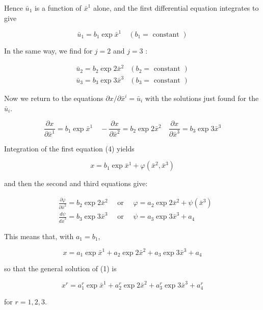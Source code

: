 \documentclass[10pt]{article}
\begin{document}
Hence $\bar{u}_{1}$ is a function of $\bar{x}^{1}$ alone, and the first differential equation integrates to give

$$
\bar{u}_{1}=b_{1} \exp \bar{x}^{1} \quad\left(b_{1}=\text { constant }\right)
$$

In the same way, we find for $j=2$ and $j=3$ :

$$
\begin{array}{ll}
\bar{u}_{2}=b_{2} \exp 2 \bar{x}^{2} & \left(b_{2}=\text { constant }\right) \\
\bar{u}_{3}=b_{3} \exp 3 \bar{x}^{3} & \left(b_{3}=\text { constant }\right)
\end{array}
$$

Now we return to the equations $\partial x / \partial \bar{x}^{i}=\bar{u}_{i}$ with the solutions just found for the $\bar{u}_{i}$.


\begin{equation*}
\frac{\partial x}{\partial \bar{x}^{1}}=b_{1} \exp \bar{x}^{1} \quad-\frac{\partial x}{\partial \bar{x}^{2}}=b_{2} \exp 2 \bar{x}^{2} \quad \frac{\partial x}{\partial \bar{x}^{3}}=b_{3} \exp 3 \bar{x}^{3} \tag{4}
\end{equation*}


Integration of the first equation (4) yields

$$
x=b_{1} \exp \bar{x}^{1}+\varphi\left(\bar{x}^{2}, \bar{x}^{3}\right)
$$

and then the second and third equations give:

$$
\begin{aligned}
& \frac{\partial \varphi}{\partial \bar{x}^{2}}=b_{2} \exp 2 \bar{x}^{2} \quad \text { or } \quad \varphi=a_{2} \exp 2 \bar{x}^{2}+\psi\left(\bar{x}^{3}\right) \\
& \frac{d \psi}{d \bar{x}^{3}}=b_{3} \exp 3 \bar{x}^{3} \quad \text { or } \quad \psi=a_{3} \exp 3 \bar{x}^{3}+a_{4}
\end{aligned}
$$

This means that, with $a_{1}=b_{1}$,

$$
x=a_{1} \exp \bar{x}^{1}+a_{2} \exp 2 \bar{x}^{2}+a_{3} \exp 3 \bar{x}^{3}+a_{4}
$$

so that the general solution of (1) is


\begin{equation*}
x^{r}=a_{1}^{r} \exp \bar{x}^{1}+a_{2}^{r} \exp 2 \bar{x}^{2}+a_{3}^{r} \exp 3 \bar{x}^{3}+a_{4}^{r} \tag{5}
\end{equation*}


for $r=1,2,3$.
\end{document}
